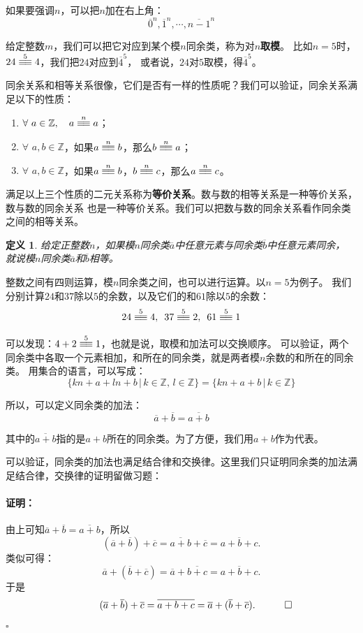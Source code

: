 \documentclass[12pt,UTF8]{ctexbook}
\newtheorem{df}{定义}[section]
\renewenvironment{proof}{\paragraph{\textbf{证明：}}}{\hfill$\square$}
\newcommand{\tong}[1]{\overset{#1}{\equiv\joinrel\equiv}}
\begin{document}
如果要强调$n$，可以把$n$加在右上角：
$$\overline{0}^n,\overline{1}^n,\cdots,\overline{n-1}^n$$

给定整数$m$，我们可以把它对应到某个模$n$同余类，称为对$n$\textbf{取模}。
比如$n=5$时，$24 \tong{5} 4$，我们把$24$对应到$\overline{4}^5$，
或者说，$24$对$5$取模，得$\overline{4}^5$。

同余关系和相等关系很像，它们是否有一样的性质呢？我们可以验证，同余关系满足以下的性质：
\begin{enumerate}
    \item $\forall \,\, a\in \mathbb{Z}, \quad a \tong{n} a$；
    \item $\forall \,\, a, b \in \mathbb{Z}$，如果$a \tong{n} b$，那么$b \tong{n} a$；
    \item $\forall \,\, a, b \in \mathbb{Z}$，如果$a \tong{n} b$，$b \tong{n} c$，那么$a \tong{n} c$。
\end{enumerate}

满足以上三个性质的二元关系称为\textbf{等价关系}。数与数的相等关系是一种等价关系，数与数的同余关系
也是一种等价关系。我们可以把数与数的同余关系看作同余类之间的相等关系。

\begin{df}
    给定正整数$n$，如果模$n$同余类$\overline{a}$中任意元素与同余类$\overline{b}$中任意元素同余，
    就说模$n$同余类$\overline{a}$和$\overline{b}$相等。
\end{df}

整数之间有四则运算，模$n$同余类之间，也可以进行运算。以$n=5$为例子。
我们分别计算$24$和$37$除以$5$的余数，以及它们的和$61$除以$5$的余数：
$$ 24 \tong{5} 4, \,\,\, 37 \tong{5} 2 , \,\,\, 61 \tong{5} 1$$

可以发现：$ 4 + 2 \tong{5} 1$，也就是说，取模和加法可以交换顺序。
可以验证，两个同余类中各取一个元素相加，和所在的同余类，就是两者模$n$余数的和所在的同余类。
用集合的语言，可以写成：
$$\{kn + a + ln + b \, | \, k\in\mathbb{Z}, \, l\in\mathbb{Z} \} = \{kn + a + b \, | \, k\in\mathbb{Z} \}$$

所以，可以定义同余类的加法：
$$ \overline{a} + \overline{b} = \overline{a + b}$$

其中的$\overline{a + b}$指的是$a+b$所在的同余类。为了方便，我们用$a + b$作为代表。

可以验证，同余类的加法也满足结合律和交换律。这里我们只证明同余类的加法满足结合律，交换律的证明留做习题：

\begin{proof}
    由上可知$ \overline{a} + \overline{b} = \overline{a + b}$，所以
    $$ (\overline{a} + \overline{b}) + \overline{c} = \overline{a + b}+ \overline{c} = \overline{a + b + c}.$$
    类似可得：
    $$ \overline{a} + (\overline{b} + \overline{c}) = \overline{a}+ \overline{b + c} = \overline{a + b + c}.$$
    于是
    $$ \quad \quad \quad (\overline{a} + \overline{b}) + \overline{c}  = \overline{a + b + c} = \overline{a} + (\overline{b} + \overline{c}). \quad \qedhere$$
\end{proof}
\end{document}
